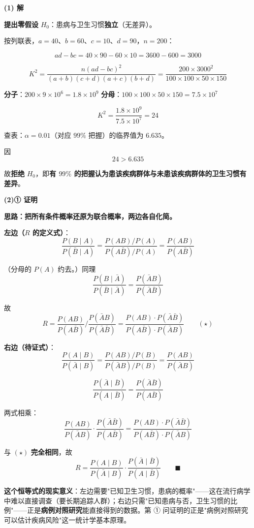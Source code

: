 \textbf{(1) 解}

\textbf{提出零假设} $H_0$：患病与卫生习惯\textbf{独立}（无差异）。

按列联表，$a=40$、$b=60$、$c=10$、$d=90$，$n=200$：

\[ad-bc=40\times90-60\times10=3600-600=3000\]

\[K^{2}=\frac{n(ad-bc)^{2}}{(a+b)(c+d)(a+c)(b+d)}=\frac{200\times3000^{2}}{100\times100\times50\times150}\]

\textbf{分子}：$200\times9\times10^{6}=1.8\times10^{9}$
\textbf{分母}：$100\times100\times50\times150=7.5\times10^{7}$

\[K^{2}=\frac{1.8\times10^{9}}{7.5\times10^{7}}=24\]

查表：$\alpha=0.01$（对应 $99\%$ 把握）的临界值为 $6.635$。

因
\[24>6.635\]

故\textbf{拒绝} $H_0$，即\textbf{有 $99\%$ 的把握认为患该疾病群体与未患该疾病群体的卫生习惯有差异}。

\par\medskip

\textbf{(2)① 证明}

\textbf{思路：把所有条件概率还原为联合概率，两边各自化简。}

\textbf{左边（$R$ 的定义式）}：
\[\frac{P(B\mid A)}{P(\bar B\mid A)}=\frac{P(AB)/P(A)}{P(A\bar B)/P(A)}=\frac{P(AB)}{P(A\bar B)}\]

（分母的 $P(A)$ 约去。）同理
\[\frac{P(B\mid\bar A)}{P(\bar B\mid\bar A)}=\frac{P(\bar AB)}{P(\bar A\bar B)}\]

故
\[R=\frac{P(AB)}{P(A\bar B)}\Big/\frac{P(\bar AB)}{P(\bar A\bar B)}=\frac{P(AB)\cdot P(\bar A\bar B)}{P(A\bar B)\cdot P(\bar AB)}\qquad(\star)\]

\textbf{右边（待证式）}：
\[\frac{P(A\mid B)}{P(\bar A\mid B)}=\frac{P(AB)/P(B)}{P(\bar AB)/P(B)}=\frac{P(AB)}{P(\bar AB)}\]

\[\frac{P(\bar A\mid\bar B)}{P(A\mid\bar B)}=\frac{P(\bar A\bar B)}{P(A\bar B)}\]

两式相乘：
\[\frac{P(AB)}{P(\bar AB)}\cdot\frac{P(\bar A\bar B)}{P(A\bar B)}=\frac{P(AB)\cdot P(\bar A\bar B)}{P(A\bar B)\cdot P(\bar AB)}\]

与 $(\star)$ \textbf{完全相同}，故
\[R=\frac{P(A\mid B)}{P(\bar A\mid B)}\cdot\frac{P(\bar A\mid\bar B)}{P(A\mid\bar B)}\qquad\blacksquare\]

\begin{gktip}
\textbf{这个恒等式的现实意义}：左边需要"已知卫生习惯，患病的概率"——这在流行病学中难以直接调查（要长期追踪人群）；右边只需"已知患病与否，卫生习惯的比例"——正是\textbf{病例对照研究}能直接得到的数据。第 ① 问证明的正是"病例对照研究可以估计疾病风险"这一统计学基本原理。
\end{gktip}


